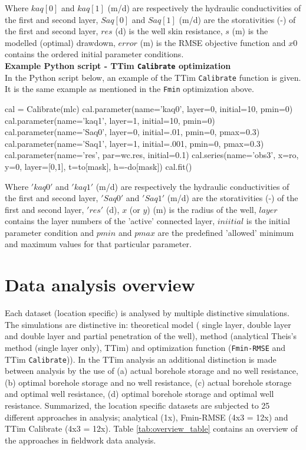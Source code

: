 Where $kaq[0]$ and $kaq[1]$ (m/d) are respectively the hydraulic conductivities of the first and second layer, $Saq[0]$ and $Saq[1]$ (m/d) are the storativities (-) of the first and second layer, $res$ (d) is the well skin resistance, $s$ (m) is the modelled (optimal) drawdown, $error$ (m) is the RMSE objective function and $x0$ contains the ordered initial parameter conditions. \\

\textbf{Example Python script - TTim \texttt{Calibrate} optimization} \\
In the Python script below, an example of the TTim \texttt{Calibrate} function is given. It is the same example as mentioned in the \texttt{Fmin} optimization above. 

\begin{python}[h!]
cal = Calibrate(mlc)
cal.parameter(name='kaq0', layer=0, initial=10, pmin=0)
cal.parameter(name='kaq1', layer=1, initial=10, pmin=0)
cal.parameter(name='Saq0', layer=0, initial=.01, pmin=0, pmax=0.3)
cal.parameter(name='Saq1', layer=1, initial=.001, pmin=0, pmax=0.3)
cal.parameter(name='res', par=wc.res, initial=0.1)
cal.series(name='obs3', x=ro, y=0, layer=[0,1], t=to[mask], h=-do[mask])
cal.fit()
\end{python}

Where $'kaq0'$ and $'kaq1'$ (m/d) are respectively the hydraulic conductivities of the first and second layer, $'Saq0'$ and $'Saq1'$ (m/d) are the storativities (-) of the first and second layer, $'res'$ (d), $x$ (or $y$) (m) is the radius of the well, $layer$ contains the layer numbers of the 'active' connected layer, $iniitial$ is the initial parameter condition and $pmin$ and $pmax$ are the predefined 'allowed' minimum and maximum  values for that particular parameter.

\section{Data analysis overview}
\label{sec:data_analysis overview}
Each dataset (location specific) is analysed by multiple distinctive simulations. The simulations are distinctive in: theoretical model ( single layer, double layer and double layer and partial penetration of the well), method (analytical Theis's method (single layer only), TTim) and optimization function (\texttt{Fmin-RMSE} and TTim \texttt{Calibrate})). In the TTim analysis an additional distinction is made between analysis by the use of (a) actual borehole storage and no well resistance, (b) optimal borehole storage and no well resistance, (c) actual borehole storage and optimal well resistance, (d) optimal borehole storage and optimal well resistance. Summarized, the location specific datasets are subjected to 25 different approaches in analysis; analytical (1x), Fmin-RMSE (4x3 = 12x) and TTim Calibrate (4x3 = 12x). Table \ref{tab:overview_table} contains an overview of the approaches in fieldwork data analysis.   

